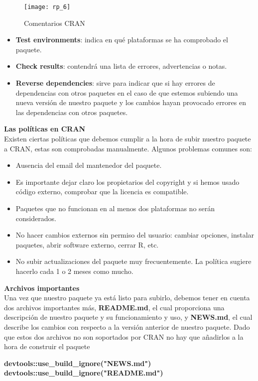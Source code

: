 \begin{figure}[H]
    \centering
    \texttt{[image: rp\_6]}
    \caption{Comentarios CRAN}
    \label{fig:comentarios}
\end{figure} 
\begin{itemize}

    \item \textbf{Test environments}: indica en qu\'e plataformas se ha comprobado el paquete.
    \item \textbf{Check results}: contendr\'a una lista de errores, advertencias o notas.
    \item \textbf{Reverse dependencies}: sirve para indicar que si hay errores de dependencias con
otros paquetes en el caso de que estemos subiendo una nueva versi\'on de nuestro
paquete y los cambios hayan provocado errores en las dependencias con otros
paquetes.
\end{itemize}

\textbf{Las pol\'iticas en CRAN}\\
Existen ciertas pol\'iticas que debemos cumplir a la hora de subir nuestro paquete a CRAN,
estas son comprobadas manualmente.
Algunos problemas comunes son:
\begin{itemize}
    \item Ausencia del email del mantenedor del paquete. 
    \item Es importante dejar claro los propietarios del copyright y si hemos usado c\'odigo
externo, comprobar que la licencia es compatible.
    \item Paquetes que no funcionan en al menos dos plataformas no ser\'an considerados.
    \item No hacer cambios externos sin permiso del usuario: cambiar opciones, instalar
paquetes, abrir software externo, cerrar R, etc.
    \item No subir actualizaciones del paquete muy frecuentemente. La pol\'itica sugiere hacerlo
cada 1 o 2 meses como mucho.
\end{itemize}

\textbf{Archivos importantes}\\
Una vez que nuestro paquete ya est\'a listo para subirlo, debemos tener en cuenta dos archivos
importantes m\'as,\textbf{ README.md}, el cual proporciona una descripci\'on de nuestro paquete y su
funcionamiento y uso, y \textbf{NEWS.md}, el cual describe los cambios con respecto a la versi\'on
anterior de nuestro paquete. Dado que estos dos archivos no son soportados por CRAN no
hay que a\~nadirlos a la hora de construir el paquete
\begin{center}
    \textbf{devtools::use\_build\_ignore("NEWS.md")
    devtools::use\_build\_ignore("README.md")}
\end{center}


